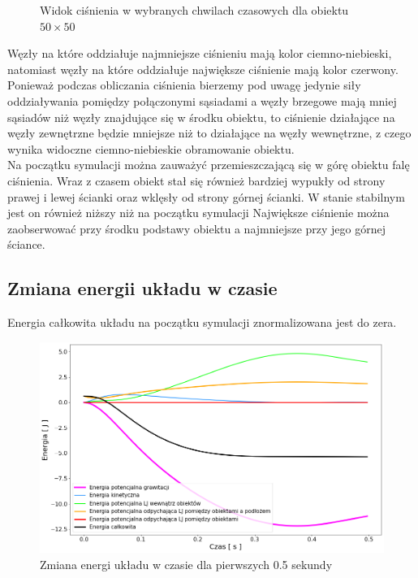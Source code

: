 \documentclass[12pt, letterpaper]{report}
\begin{document}
\begin{figure}[h]
        \caption{Widok ciśnienia w wybranych chwilach czasowych dla obiektu $50 \times 50$}
    \end{figure}

    Węzły na które oddziałuje najmniejsze ciśnieniu mają kolor ciemno-niebieski, natomiast węzły na które oddziałuje 
    największe ciśnienie mają kolor czerwony. Ponieważ podczas obliczania ciśnienia bierzemy pod uwagę jedynie 
    siły oddziaływania pomiędzy połączonymi sąsiadami a węzły brzegowe mają mniej sąsiadów niż węzły znajdujące
    się w środku obiektu, to ciśnienie działające na węzły zewnętrzne będzie mniejsze niż to działające na
    węzły wewnętrzne, z czego wynika widoczne ciemno-niebieskie obramowanie obiektu. \\

    Na początku symulacji można zauważyć przemieszczającą się w górę obiektu falę ciśnienia. Wraz z czasem 
    obiekt stał się również bardziej wypukły od strony prawej i lewej ścianki
    oraz wklęsły od strony górnej ścianki. W stanie stabilnym jest on również niższy niż na początku symulacji 
    Największe ciśnienie można zaobserwować przy środku podstawy obiektu a najmniejsze przy jego 
    górnej ściance.

    \subsection{Zmiana energii układu w czasie}
    Energia całkowita układu na początku symulacji znormalizowana jest do zera. 

    \begin{figure}[H]
        \centering
        \includegraphics[width=14cm]{pressure_energy_01}
        \caption{
            Zmiana energi układu w czasie dla pierwszych 0.5 sekundy
        }
    \end{figure}
\end{document}
